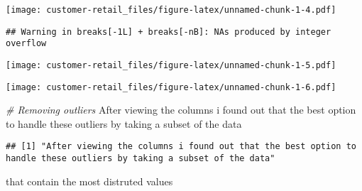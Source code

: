 \documentclass[
]{article}
\newenvironment{Shaded}{\begin{snugshade}}{\end{snugshade}}
\newcommand{\AttributeTok}[1]{\textcolor[rgb]{0.77,0.63,0.00}{#1}}
\newcommand{\CommentTok}[1]{\textcolor[rgb]{0.56,0.35,0.01}{\textit{#1}}}
\newcommand{\FunctionTok}[1]{\textcolor[rgb]{0.00,0.00,0.00}{#1}}
\newcommand{\NormalTok}[1]{#1}
\newcommand{\SpecialCharTok}[1]{\textcolor[rgb]{0.00,0.00,0.00}{#1}}
\newcommand{\StringTok}[1]{\textcolor[rgb]{0.31,0.60,0.02}{#1}}
\begin{document}
\texttt{[image: customer-retail\_files/figure-latex/unnamed-chunk-1-4.pdf]}

\begin{Shaded}
\end{Shaded}

\begin{verbatim}
## Warning in breaks[-1L] + breaks[-nB]: NAs produced by integer overflow
\end{verbatim}

\texttt{[image: customer-retail\_files/figure-latex/unnamed-chunk-1-5.pdf]}

\begin{Shaded}
\end{Shaded}

\texttt{[image: customer-retail\_files/figure-latex/unnamed-chunk-1-6.pdf]}

\begin{Shaded}
\begin{Highlighting}[]
\CommentTok{\# Removing outliers }
\StringTok{\textquotesingle{}After viewing the columns i found out that the best option to handle these outliers by taking a subset of the data\textquotesingle{}}
\end{Highlighting}
\end{Shaded}

\begin{verbatim}
## [1] "After viewing the columns i found out that the best option to handle these outliers by taking a subset of the data"
\end{verbatim}

\begin{Shaded}
\begin{Highlighting}[]
\StringTok{\textquotesingle{}that contain the most distruted values\textquotesingle{}}
\end{Highlighting}
\end{Shaded}
\end{document}
